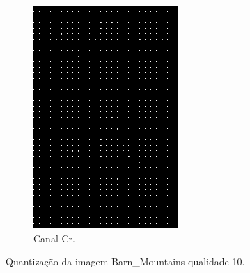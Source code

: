 \documentclass[a4paper, 12pt]{article}
\begin{document}
\begin{figure}[H]
            \begin{subfigure}{0.3\textwidth}
                \centering
                \includegraphics[scale=0.5]{resources/Quantization/CRQuantization10.png} 
                \caption{ Canal Cr.}
            \end{subfigure}
            \caption{\label{fig:my_label} Quantização da imagem Barn\_Mountains qualidade 10.}
        \end{figure}
        
        \vspace{0.5cm}
    
\end{document}
